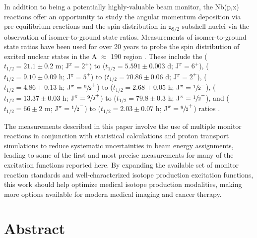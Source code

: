   
In addition to being a potentially highly-valuable beam monitor, the Nb(p,x) reactions offer an opportunity to study the angular momentum deposition via pre-equilibrium reactions and the spin distribution in g$_{9/2}$ subshell nuclei via the observation of isomer-to-ground state ratios.  
Measurements of isomer-to-ground state ratios have been used for over 20 years to probe the spin distribution of excited nuclear states in the A $\approx$ 190 region \cite{PhysRevC.73.034613,PhysRevC.45.1171}.
These include the  ($t_{1/2}=21.1\pm0.2$ m; J$^\pi=2^+$) to   ($t_{1/2}=5.591\pm0.003$ d; J$^\pi=6^+$),  ($t_{1/2}=9.10\pm0.09$ h; J$^\pi=5^+$) to   ($t_{1/2}=70.86\pm0.06$ d; J$^\pi=2^+$),   ($t_{1/2}=4.86\pm0.13$ h; J$^\pi=\sfrac{9}{2}^+$) to   ($t_{1/2}=2.68\pm0.05$ h; J$^\pi=\sfrac{1}{2}^-$),   ($t_{1/2}=13.37\pm0.03$ h; J$^\pi=\sfrac{9}{2}^+$) to   ($t_{1/2}=79.8\pm0.3$ h; J$^\pi=\sfrac{1}{2}^-$),  and  ($t_{1/2}=66\pm2$ m; J$^\pi=\sfrac{1}{2}^-$) to   ($t_{1/2}=2.03\pm0.07$ h; J$^\pi=\sfrac{9}{2}^+$)  ratios \cite{Dong2015,Nesaraja2010,Singh2014,Johnson2015,Singh2013}.  
 
 
The measurements described in this paper involve the use of multiple monitor reactions in conjunction with statistical calculations and proton transport simulations to reduce systematic uncertainties in beam energy assignments, leading to some of the first and most precise measurements  for many of the excitation functions reported here. 
By expanding the available set of monitor reaction standards and well-characterized isotope production excitation functions, this work should help optimize medical isotope production modalities, making more options   available for modern medical imaging and cancer therapy.






% 
% 
\section{Abstract}



% 
% 



% 
% 



